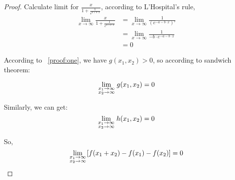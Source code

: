 \begin{proof}
Calculate limit for $\frac{x}{1+\frac{1}{e^{a+b\cdot x}}}$, according to L'Hospital's rule,
\[
\begin{aligned}
\lim_{x \to \infty}\frac{x}{1+\frac{1}{e^{a+b\cdot x}}}&=\lim_{x \to \infty}\frac{1}{(e^{-a-b\cdot x})'}\\
&=\lim_{x \to \infty}\frac{1}{-b\cdot e^{-a-b\cdot x}}\\
&=0
\end{aligned}
\]

According to ~\ref{proof:one}, we have $g(x_1,x_2)>0$, so according to sandwich theorem:

\[
\mathop {\lim }\limits_{\scriptstyle x_1 \to \infty  \hfill \atop  \scriptstyle x_2 \to \infty  \hfill}g(x_1,x_2)=0
\]

Similarly, we can get:
\[
\mathop {\lim }\limits_{\scriptstyle x_1 \to \infty  \hfill \atop  \scriptstyle x_2 \to \infty  \hfill}h(x_1,x_2)=0
\]

So,
\[
\mathop {\lim }\limits_{\scriptstyle x_1 \to \infty  \hfill \atop  \scriptstyle x_2 \to \infty  \hfill}[f(x_1+x_2)-f(x_1)-f(x_2)]=0
\]


\end{proof}